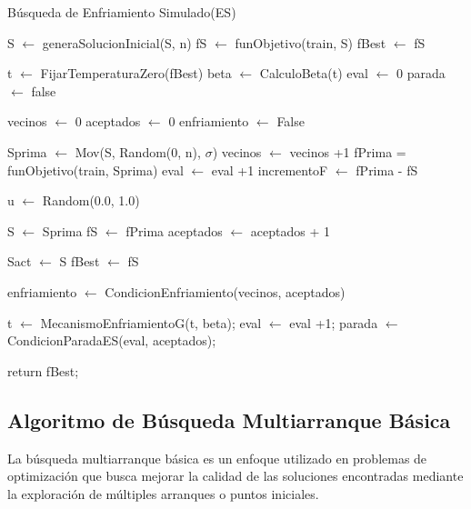 \begin{algorithm}[H]
	\caption{Búsqueda de Enfriamiento Simulado(ES)}
	
	\BlankLine
	
	S $\leftarrow$ generaSolucionInicial(S, n)\;
	\BlankLine
	fS $\leftarrow$ funObjetivo(train, S) \; 
	fBest $\leftarrow$ fS\;
	
	\BlankLine
	t $\leftarrow$ FijarTemperaturaZero(fBest)\;
	beta $\leftarrow$ CalculoBeta(t)\;
	eval $\leftarrow$ 0\;
	\BlankLine
	parada $\leftarrow$ false\;
	 {
		vecinos $\leftarrow$ 0\;
		aceptados $\leftarrow$ 0\;
		enfriamiento $\leftarrow$ False\;
		
		\BlankLine
		 {
			Sprima $\leftarrow$ Mov(S, Random(0, n), $\sigma$)\; 
			vecinos $\leftarrow$ vecinos +1\;
			\BlankLine
			fPrima = funObjetivo(train, Sprima)\;
			eval $\leftarrow$ eval +1\;  
			\BlankLine
			incrementoF $\leftarrow$ fPrima - fS\;
			
			\BlankLine
			u $\leftarrow$ Random(0.0, 1.0)\;
			 {
				S $\leftarrow$ Sprima\;  
				fS $\leftarrow$ fPrima\;
				aceptados $\leftarrow$ aceptados + 1\; 
				
				 {
					Sact $\leftarrow$ S\;
					fBest $\leftarrow$ fS\;
				}
			}
			enfriamiento $\leftarrow$ CondicionEnfriamiento(vecinos, aceptados) \;
		}
		t $\leftarrow$ MecanismoEnfriamientoG(t, beta); 
		eval $\leftarrow$ eval +1; 
		parada $\leftarrow$ CondicionParadaES(eval, aceptados);
	}
	\BlankLine
	return fBest;
	
	
	
\end{algorithm}

\subsection{Algoritmo de Búsqueda Multiarranque Básica}
La búsqueda multiarranque básica es un enfoque utilizado en problemas de optimización que busca mejorar la calidad de las soluciones encontradas mediante la exploración de múltiples arranques o puntos iniciales.\\

